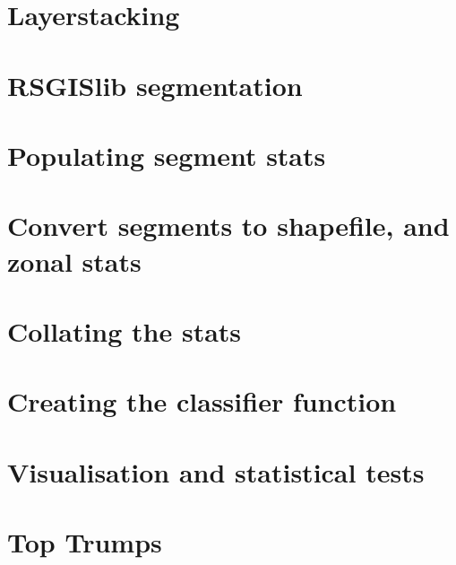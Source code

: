 \documentclass[a4paper,12pt]{article}
\begin{document}
\section{Layerstacking}
\section{RSGISlib segmentation}
\section{Populating segment stats}
\section{Convert segments to shapefile, and zonal stats}
\section{Collating the stats}
\section{Creating the classifier function}
\section{Visualisation and statistical tests}
\section{Top Trumps}
\end{document}
